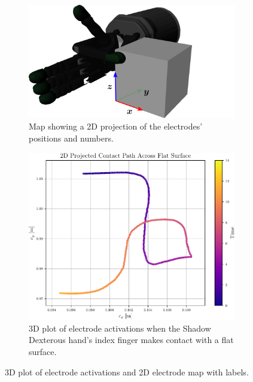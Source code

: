 \begin{figure}[h]
	\centering
	\begin{subfigure}[b]{0.48\textwidth}
		\centering
		\includegraphics[width=\textwidth]{chapters/1-tactile-perception/fig/inkscape/flat-contact-coor.pdf}
		\caption{Map showing a 2D projection of the electrodes' positions and numbers.}
		\label{fig:normal-flat-contact-3d}
	\end{subfigure}
	\hfill
	\begin{subfigure}[b]{0.48\textwidth}
		\centering
		\includegraphics[width=\textwidth]{chapters/1-tactile-perception/fig/matplotlib/2d-projected-contact-path-across-flat-surface.pdf}
		\caption{3D plot of electrode activations when the Shadow Dexterous hand's index finger makes contact with a flat surface.}
		\label{fig:2d-projected-contact-path-across-flat-surface}
	\end{subfigure}
		\caption{3D plot of electrode activations and 2D electrode map with labels.}
		\label{fig:experimental-setup-for-normal-estimation}
\end{figure}


